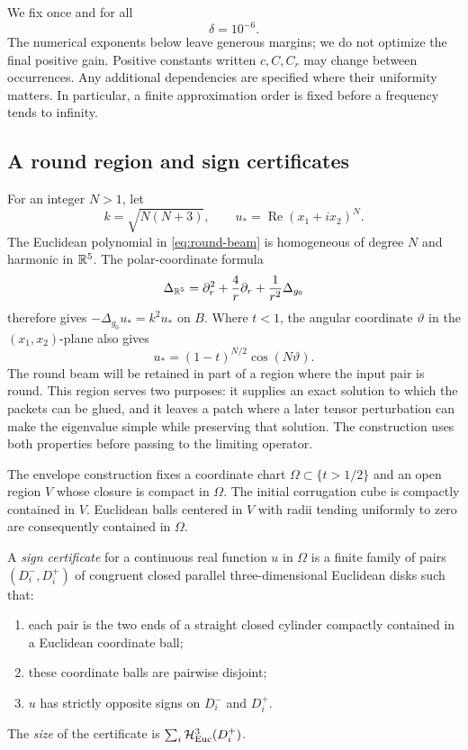 We fix once and for all
\[
 \delta=10^{-6}.
\]
The numerical exponents below leave generous margins; we do not optimize
the final positive gain.
Positive constants written $c,C,C_r$ may change between occurrences.
Any additional dependencies are specified where their uniformity
matters. In particular, a finite approximation order is fixed before a
frequency tends to infinity.

\subsection{A round region and sign certificates}

For an integer $N>1$, let
\begin{equation}\label{eq:round-beam}
 k=\sqrt{N(N+3)},\qquad
 u_*=\operatorname{Re}(x_1+i x_2)^N .
\end{equation}
The Euclidean polynomial in \eqref{eq:round-beam} is homogeneous of
degree $N$ and harmonic in $\mathbb R^5$. The polar-coordinate formula
\[
 \Delta_{\mathbb R^5}
 =\partial_r^2+\frac4r\partial_r+\frac1{r^2}\Delta_{g_0}
\]
therefore gives $-\Delta_{g_0}u_*=k^2u_*$ on $B$.
Where $t<1$, the angular coordinate $\vartheta$ in the
$(x_1,x_2)$-plane also gives
\[
 u_*=(1-t)^{N/2}\cos(N\vartheta).
\]
The round beam will be retained in part of a region where the input
pair is round. This region serves two purposes: it supplies an exact
solution to which the packets can be glued, and it leaves a patch where
a later tensor perturbation can make the eigenvalue simple while
preserving that solution. The construction uses both properties before
passing to the limiting operator.

The envelope construction fixes a coordinate chart
$\Omega\subset\{t>1/2\}$ and an open region $V$ whose closure is compact
in $\Omega$. The initial corrugation cube is compactly contained in
$V$. Euclidean balls centered in $V$ with radii tending uniformly to
zero are consequently contained in $\Omega$.

\begin{definition}\label{def:certificate}
A \emph{sign certificate} for a continuous real function $u$ in
$\Omega$ is a finite family of pairs $(D_i^-,D_i^+)$ of congruent
closed parallel three-dimensional Euclidean disks such that:
\begin{enumerate}[label=\textup{(\roman*)}]
 \item each pair is the two ends of a straight closed cylinder
 compactly contained in a Euclidean coordinate ball;
 \item these coordinate balls are pairwise disjoint;
 \item $u$ has strictly opposite signs on $D_i^-$ and $D_i^+$.
\end{enumerate}
The \emph{size} of the certificate is
$\sum_i\mathcal H_{\mathrm{Euc}}^3(D_i^+)$.
\end{definition}

